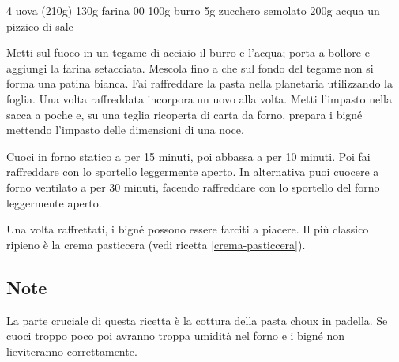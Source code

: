 \begin{ingreds}
	4 uova (210g) 
	130g farina 00
	100g burro 
	5g zucchero semolato
	200g acqua
	un pizzico di sale


\end{ingreds}

\begin{method}
Metti sul fuoco in un tegame di acciaio il burro e l'acqua; porta a bollore e aggiungi la farina setacciata. Mescola fino a che sul fondo del tegame non si forma una patina bianca.
Fai raffreddare la pasta nella planetaria utilizzando la foglia. Una volta raffreddata incorpora un uovo alla volta.
Metti l'impasto nella sacca a poche e, su una teglia ricoperta di carta da forno, prepara i bigné mettendo l'impasto delle dimensioni di una noce.

	Cuoci in forno statico a  per 15 minuti, poi abbassa a  per 10 minuti. Poi fai raffreddare con lo sportello leggermente aperto.
In alternativa puoi cuocere a forno ventilato a  per 30 minuti, facendo raffreddare con lo sportello del forno leggermente aperto.

	Una volta raffrettati, i bigné possono essere farciti a piacere. Il più classico ripieno è la crema pasticcera (vedi ricetta \ref{crema-pasticcera}).
\end{method}

\subsection*{Note}
	La parte cruciale di questa ricetta è la cottura della pasta choux in padella. Se cuoci troppo poco poi avranno troppa umidità nel forno e i bigné non lieviteranno correttamente.



